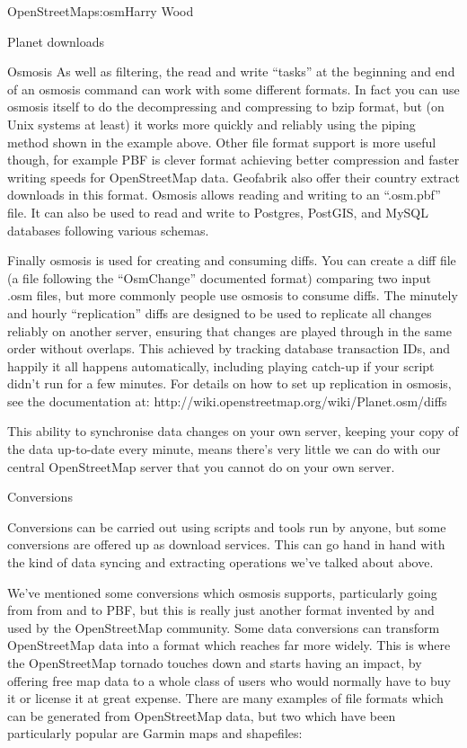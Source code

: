 \begin{aosachapter}{OpenStreetMap}{s:osm}{Harry Wood}
\begin{aosasect1}{Planet downloads}
\begin{aosasect2}{Osmosis}
As well as filtering, the read and write ``tasks'' at the beginning
and end of an osmosis command can work with some different formats. In
fact you can use osmosis itself to do the decompressing and
compressing to bzip format, but (on Unix systems at least) it works
more quickly and reliably using the piping method shown in the example
above. Other file format support is more useful though, for example
PBF is clever format achieving better compression and faster writing
speeds for OpenStreetMap data. Geofabrik also offer their country
extract downloads in this format. Osmosis allows reading and writing
to an ``.osm.pbf'' file. It can also be used to read and write to
Postgres, PostGIS, and MySQL databases following various schemas.

Finally osmosis is used for creating and consuming diffs. You can
create a diff file (a file following the ``OsmChange'' documented
format) comparing two input .osm files, but more commonly people use
osmosis to consume diffs. The minutely and hourly ``replication''
diffs are designed to be used to replicate all changes reliably on
another server, ensuring that changes are played through in the same
order without overlaps. This achieved by tracking database transaction
IDs, and happily it all happens automatically, including playing
catch-up if your script didn't run for a few minutes. For details on
how to set up replication in osmosis, see the documentation at:
http://wiki.openstreetmap.org/wiki/Planet.osm/diffs

This ability to synchronise data changes on your own server, keeping
your copy of the data up-to-date every minute, means there's very
little we can do with our central OpenStreetMap server that you cannot
do on your own server.

\end{aosasect2}

\begin{aosasect2}{Conversions}

Conversions can be carried out using scripts and tools run by anyone,
but some conversions are offered up as download services. This can go
hand in hand with the kind of data syncing and extracting operations
we've talked about above.

We've mentioned some conversions which osmosis supports, particularly
going from from and to PBF, but this is really just another format
invented by and used by the OpenStreetMap community. Some data
conversions can transform OpenStreetMap data into a format which
reaches far more widely. This is where the OpenStreetMap tornado
touches down and starts having an impact, by offering free map data to
a whole class of users who would normally have to buy it or license it
at great expense. There are many examples of file formats which can be
generated from OpenStreetMap data, but two which have been
particularly popular are Garmin maps and shapefiles:


\end{aosasect2}
\end{aosasect1}
\end{aosachapter}
